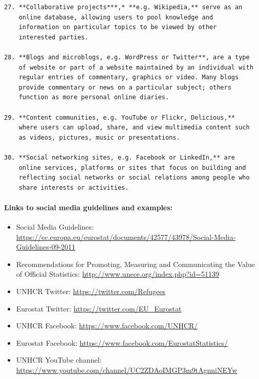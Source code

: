 \documentclass[
]{article}
\begin{document}
\begin{verbatim}
27. **Collaborative projects***,* **e.g. Wikipedia,** serve as an
    online database, allowing users to pool knowledge and
    information on particular topics to be viewed by other
    interested parties.

28. **Blogs and microblogs, e.g. WordPress or Twitter**, are a type
    of website or part of a website maintained by an individual with
    regular entries of commentary, graphics or video. Many blogs
    provide commentary or news on a particular subject; others
    function as more personal online diaries.

29. **Content communities, e.g. YouTube or Flickr, Delicious,**
    where users can upload, share, and view multimedia content such
    as videos, pictures, music or presentations.

30. **Social networking sites, e.g. Facebook or LinkedIn,** are
    online services, platforms or sites that focus on building and
    reflecting social networks or social relations among people who
    share interests or activities.
\end{verbatim}

\hypertarget{links-to-social-media-guidelines-and-examples-1}{%
\paragraph{Links to social media guidelines and examples:}\label{links-to-social-media-guidelines-and-examples-1}}

\begin{itemize}
\item
  Social Media Guidelines:\\
  \url{https://ec.europa.eu/eurostat/documents/42577/43978/Social-Media-Guidelines-09-2011}
\item
  Recommendations for Promoting, Measuring and Communicating the Value
  of Official Statistics: \url{http://www.unece.org/index.php?id=51139}
\item
  UNHCR Twitter: \url{https://twitter.com/Refugees}
\item
  Eurostat Twitter: \url{https://twitter.com/EU_Eurostat} {}
\item
  UNHCR Facebook: \url{https://www.facebook.com/UNHCR/}
\item
  Eurostat Facebook: \url{https://www.facebook.com/EurostatStatistics/}
\item
  UNHCR YouTube channel:
  \url{https://www.youtube.com/channel/UC2ZDAoIMGP3m9tAgnniNEYw}
\end{itemize}
\end{document}
